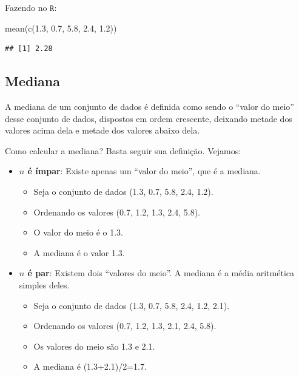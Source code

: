 \documentclass[
]{book}
\newenvironment{Shaded}{\begin{snugshade}}{\end{snugshade}}
\newcommand{\FloatTok}[1]{\textcolor[rgb]{0.00,0.00,0.81}{#1}}
\newcommand{\FunctionTok}[1]{\textcolor[rgb]{0.00,0.00,0.00}{#1}}
\newcommand{\NormalTok}[1]{#1}
\providecommand{\tightlist}{%
  \setlength{\itemsep}{0pt}\setlength{\parskip}{0pt}}
\begin{document}
Fazendo no \(\texttt{R}\):

\begin{Shaded}
\begin{Highlighting}[]
\FunctionTok{mean}\NormalTok{(}\FunctionTok{c}\NormalTok{(}\FloatTok{1.3}\NormalTok{, }\FloatTok{0.7}\NormalTok{, }\FloatTok{5.8}\NormalTok{, }\FloatTok{2.4}\NormalTok{, }\FloatTok{1.2}\NormalTok{))}
\end{Highlighting}
\end{Shaded}

\begin{verbatim}
## [1] 2.28
\end{verbatim}

\hypertarget{mediana}{%
\subsection{Mediana}\label{mediana}}

A mediana de um conjunto de dados é definida como sendo o ``valor do meio'' desse conjunto de dados, dispostos em ordem crescente, deixando metade dos valores acima dela e metade dos valores abaixo dela.

Como calcular a mediana? Basta seguir sua definição. Vejamos:

\begin{itemize}
\tightlist
\item
  \textbf{\(n\) é ímpar}: Existe apenas um ``valor do meio'', que é a mediana.

  \begin{itemize}
  \tightlist
  \item
    Seja o conjunto de dados (1.3, 0.7, 5.8, 2.4, 1.2).
  \item
    Ordenando os valores (0.7, 1.2, 1.3, 2.4, 5.8).
  \item
    O valor do meio é o 1.3.
  \item
    A mediana é o valor 1.3.
  \end{itemize}
\item
  \textbf{\(n\) é par}: Existem dois ``valores do meio''. A mediana é a média aritmética simples deles.

  \begin{itemize}
  \tightlist
  \item
    Seja o conjunto de dados (1.3, 0.7, 5.8, 2.4, 1.2, 2.1).
  \item
    Ordenando os valores (0.7, 1.2, 1.3, 2.1, 2.4, 5.8).
  \item
    Os valores do meio são 1.3 e 2.1.
  \item
    A mediana é (1.3+2.1)/2=1.7.
  \end{itemize}
\end{itemize}
\end{document}
